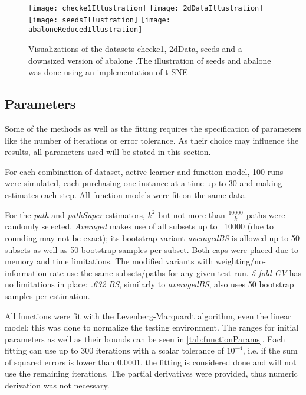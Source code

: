 \begin{figure}[h]
	\centering
	\texttt{[image: checke1Illustration]}
	\texttt{[image: 2dDataIllustration]}
	\texttt{[image: seedsIllustration]}
	\texttt{[image: abaloneReducedIllustration]}
	\caption{Visualizations of the datasets checke1, 2dData, seeds and a downsized version of abalone \cite{Chapelle2005,KremplEtAl2014,CharytanowiczEtAl2010,NashEtAl1994}.\newline The illustration of seeds and abalone was done using an implementation of t-SNE \cite{vanDerMaaten2008}}
	\label{fig:datasetIllustrations}
\end{figure}

\subsection{Parameters}

Some of the methods as well as the fitting requires the specification of parameters like the number of iterations or error tolerance. As their choice may influence the results, all parameters used will be stated in this section.

For each combination of dataset, active learner and function model, 100 runs were simulated, each purchasing one instance at a time up to 30 and making estimates each step. All function models were fit on the same data.

For the \textit{path} and \textit{pathSuper} estimators, $k^2$ but not more than $\frac{10000}{k}$ paths were randomly selected. \textit{Averaged} makes use of all subsets up to ~10000 (due to rounding may not be exact); its bootstrap variant \textit{averagedBS} is allowed up to 50 subsets as well as 50 bootstrap samples per subset. Both caps were placed due to memory and time limitations. The modified variants with weighting/no-information rate use the same subsets/paths for any given test run. \textit{5-fold CV} has no limitations in place; \textit{.632 BS}, similarly to \textit{averagedBS}, also uses 50 bootstrap samples per estimation.

All functions were fit with the Levenberg-Marquardt algorithm, even the linear model; this was done to normalize the testing environment. The ranges for initial parameters as well as their bounds can be seen in \ref{tab:functionParams}. Each fitting can use up to 300 iterations with a scalar tolerance of $10^{-4}$, i.e. if the sum of squared errors is lower than $0.0001$, the fitting is considered done and will not use the remaining iterations. The partial derivatives were provided, thus numeric derivation was not necessary.


